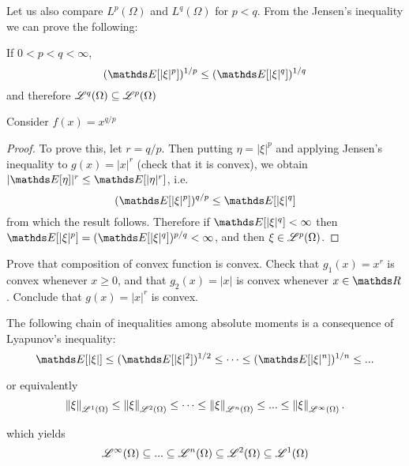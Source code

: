 Let us also compare $L^p(\Omega)$ and $L^q(\Omega)$ for $p<q$. From the Jensen's inequality we can prove the following:
\begin{corollary} \label{cor:lyapunov_ineq}
If $0 < p < q < \infty$,
\begin{equation}
    (\E[|\xi|^p])^{1/p} \le (\E[|\xi|^q])^{1/q}
\end{equation}
and therefore $\mathcal{L}^q(\Omega) \subseteq \mathcal{L}^p(\Omega)$
\end{corollary}

\begin{hint}
Consider $f(x) = x^{q/p}$
\end{hint}

\begin{proof}
To prove this, let $r = q/p$. Then putting $\eta = |\xi|^p$ and applying Jensen's inequality to $g(x) = |x|^r$ (check that it is convex), we obtain $|\E[\eta]|^r \le \E[|\eta|^r]$, i.e.
\begin{equation*}
    (\E[|\xi|^p])^{q/p} \le \E[|\xi|^{q}]
\end{equation*}
from which the result follows. Therefore if $\E[|\xi|^q] < \infty$ then $\E[|\xi|^p] = (\E[|\xi|^q])^{p/q} < \infty$, and then $\xi \in \mathcal{L}^p(\Omega)$.
\end{proof}

\begin{exercise}
Prove that composition of convex function is convex. Check that $g_1(x) = x^r$ is convex whenever $x \geq 0$, and that $g_2(x) = |x|$ is convex whenever $x \in \R$. Conclude that $g(x) = |x|^r$ is convex.
\end{exercise}

The following chain of inequalities among absolute moments is a consequence of Lyapunov's inequality:
\begin{equation*}
    \E[|\xi|] \le (\E[|\xi|^2])^{1/2} \le \cdots \le (\E[|\xi|^n])^{1/n} \leq ...
\end{equation*}

or equivalently
\begin{equation*}
    \left\| \xi \right\|_{\mathcal{L}^1(\Omega)} \le \left\| \xi \right\|_{\mathcal{L}^2(\Omega)} \le \cdots \le \left\| \xi \right\|_{\mathcal{L}^n(\Omega)} \leq ... \leq \left\| \xi \right\|_{\mathcal{L}^\infty(\Omega)}.
\end{equation*}

which yields
\begin{equation*}
    \mathcal{L}^\infty(\Omega) \subseteq ... \subseteq \mathcal{L}^n(\Omega) \subseteq \mathcal{L}^2(\Omega) \subseteq \mathcal{L}^1(\Omega)
\end{equation*}

